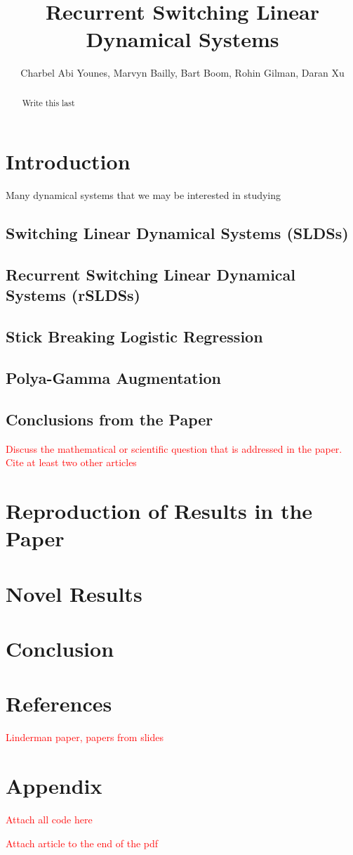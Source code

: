 \documentclass{amsart}
\title{Recurrent Switching Linear Dynamical Systems}
\author{Charbel Abi Younes, Marvyn Bailly, Bart Boom, Rohin Gilman, Daran Xu}
\date{}
\begin{document}
\begin{abstract}
	Write this last
\end{abstract}

\maketitle

\section{Introduction}

Many dynamical systems that we may be interested in studying 

\subsection{Switching Linear Dynamical Systems (SLDSs)}



\subsection{Recurrent Switching Linear Dynamical Systems (rSLDSs)}

\subsection{Stick Breaking Logistic Regression}

\subsection{Polya-Gamma Augmentation}

\subsection{Conclusions from the Paper}

\textcolor{red}{Discuss the mathematical or scientific question that is addressed in the paper. Cite at least two other articles}

\section{Reproduction of Results in the Paper}

\section{Novel Results}

\section{Conclusion}

\section{References}

\textcolor{red}{Linderman paper, papers from slides}

\section{Appendix}

\textcolor{red}{Attach all code here}

\textcolor{red}{Attach article to the end of the pdf}
\end{document}
